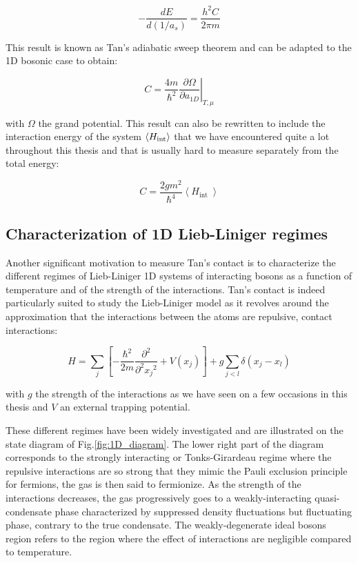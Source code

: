 \begin{equation}
    -\frac{d E}{d(1 / a_s)}=\frac{h^{2} C}{2 \pi m}
\end{equation}

\noindent This result is known as Tan's adiabatic sweep theorem and can be adapted to the 1D bosonic case \cite{barth2011tan} to obtain:

\begin{equation}
    C=\left.\frac{4 m}{\hbar^{2}} \frac{\partial \Omega}{\partial a_{1 D}}\right|_{T, \mu}
\end{equation}

\noindent with $\Omega$ the grand potential. This result can also be rewritten to include the interaction energy of the system $\langle H_{\rm{int}}\rangle$ that we have encountered quite a lot throughout this thesis and that is usually hard to measure separately from the total energy:

\begin{equation}
    C=\frac{2 g m^{2}}{\hbar^{4}}\left\langle H_{\text {int }}\right\rangle
    \label{eq:C_with_int}
\end{equation}

\subsection{Characterization of 1D Lieb-Liniger regimes}

Another significant motivation to measure Tan's contact is to characterize the different regimes of Lieb-Liniger 1D systems of interacting bosons as a function of temperature and of the strength of the interactions. Tan's contact is indeed particularly suited to study the Lieb-Liniger model as it revolves around the approximation that the interactions between the atoms are repulsive, contact interactions:

\begin{equation}
    H = \sum_j \left[ - \frac{ \hbar^2}{2m} \frac{\partial^2}{\partial^2 {x_j}^2} + V(x_j) \right] + g \sum_{j<l} \delta(x_j - x_l) 
    \label{eq:lieb_liniger}
\end{equation}

\noindent with $g$ the strength of the interactions as we have seen on a few occasions in this thesis and $V$ an external trapping potential. 


These different regimes have been widely investigated \cite{petrov2000regimes} and are illustrated on the state diagram of Fig.\ref{fig:1D_diagram}. The lower right part of the diagram corresponds to the strongly interacting or Tonks-Girardeau regime where the repulsive interactions are so strong that they mimic the Pauli exclusion principle for fermions, the gas is then said to fermionize. As the strength of the interactions decreases, the gas progressively goes to a weakly-interacting quasi-condensate phase characterized by suppressed density fluctuations but fluctuating phase, contrary to the true condensate. The weakly-degenerate ideal bosons region refers to the region where the effect of interactions are negligible compared to temperature. 

